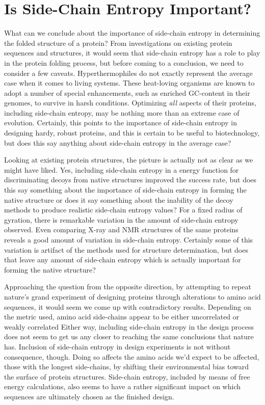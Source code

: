 \section*{Is Side-Chain Entropy Important?}
\label{sec:is_side_chain_entropy_important_}
What can we conclude about the importance of side-chain entropy in determining the folded structure of a protein? From investigations on existing protein sequences and structures, it would seem that side-chain entropy has a role to play in the protein folding process, but before coming to a conclusion, we need to consider a few caveats. Hyperthermophiles do not exactly represent the average case when it comes to living systems. These heat-loving organisms are known to adopt a number of special enhancements, such as enriched GC-content in their genomes, to survive in harsh conditions. Optimizing \emph{all} aspects of their proteins, including side-chain entropy, may be nothing more than an extreme case of evolution. Certainly, this points to the importance of side-chain entropy in designing hardy, robust proteins, and this is certain to be useful to biotechnology, but does this say anything about side-chain entropy in the average case?

Looking at existing protein structures, the picture is actually not as clear as we might have liked. Yes, including side-chain entropy in a energy function for discriminating decoys from native structures improved the success rate, but does this say something about the importance of side-chain entropy in forming the native structure or does it say something about the inability of the decoy methods to produce realistic side-chain entropy values? For a fixed radius of gyration, there is remarkable variation in the amount of side-chain entropy observed. Even comparing X-ray and NMR structures of the same proteins reveals a good amount of variation in side-chain entropy. Certainly some of this variation is artifact of the methods used for structure determination, but does that leave any amount of side-chain entropy which is actually important for forming the native structure?

Approaching the question from the opposite direction, by attempting to repeat nature's grand experiment of designing proteins through alterations to amino acid sequences, it would seem we come up with contradictory results. Depending on the metric used, amino acid side-chains appear to be either uncorrelated or weakly correlated Either way, including side-chain entropy in the design process does not seem to get us any closer to reaching the same conclusions that nature has. Inclusion of side-chain entropy in design experiments is not without consequence, though. Doing so affects the amino acids we'd expect to be affected, those with the longest side-chains, by shifting their environmental bias toward the surface of protein structures. Side-chain entropy, included by means of free energy calculations, also seems to have a rather significant impact on which sequences are ultimately chosen as the finished design.

